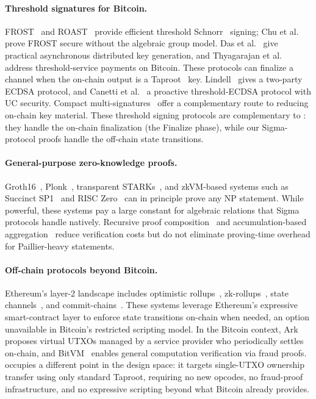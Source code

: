 \paragraph{Threshold signatures for Bitcoin.}
FROST~\cite{komlo2021frost} and ROAST~\cite{ruffing2022roast} provide efficient threshold Schnorr~\cite{schnorr1991efficient} signing; Chu et al.~\cite{chu2023practical} prove FROST secure without the algebraic group model. Das et al.~\cite{das2022async} give practical asynchronous distributed key generation, and Thyagarajan et al.~\cite{thyagarajan2025vitarit} address threshold-service payments on Bitcoin. These protocols can finalize a \thunderbolt channel when the on-chain output is a Taproot~\cite{bip341} key. Lindell~\cite{lindell2017fast} gives a two-party ECDSA protocol, and Canetti et al.~\cite{canetti2020uc} a proactive threshold-ECDSA protocol with UC security. Compact multi-signatures~\cite{boneh2018compact} offer a complementary route to reducing on-chain key material. These threshold signing protocols are complementary to \thunderbolt: they handle the on-chain finalization (the Finalize phase), while our Sigma-protocol proofs handle the off-chain state transitions.

\paragraph{General-purpose zero-knowledge proofs.}
Groth16~\cite{groth16}, Plonk~\cite{gabizon2019plonk}, transparent STARKs~\cite{ben2019scalable}, and zkVM-based systems such as Succinct SP1~\cite{sp1} and RISC Zero~\cite{risczero} can in principle prove any NP statement. While powerful, these systems pay a large constant for algebraic relations that Sigma protocols handle natively. Recursive proof composition~\cite{bowe2019halo} and accumulation-based aggregation~\cite{boneh2020recursive} reduce verification costs but do not eliminate proving-time overhead for Paillier-heavy statements.

\paragraph{Off-chain protocols beyond Bitcoin.}
Ethereum's layer-2 landscape includes optimistic rollups~\cite{arbitrum}, zk-rollups~\cite{zkSync}, state channels~\cite{miller2019sprites, dziembowski2018virtual}, and commit-chains~\cite{kalodner2018arbitrum}. These systems leverage Ethereum's expressive smart-contract layer to enforce state transitions on-chain when needed, an option unavailable in Bitcoin's restricted scripting model. In the Bitcoin context, Ark~\cite{ark2023} proposes virtual UTXOs managed by a service provider who periodically settles on-chain, and BitVM~\cite{linus2023bitvm} enables general computation verification via fraud proofs. \thunderbolt occupies a different point in the design space: it targets single-UTXO ownership transfer using only standard Taproot, requiring no new opcodes, no fraud-proof infrastructure, and no expressive scripting beyond what Bitcoin already provides.
